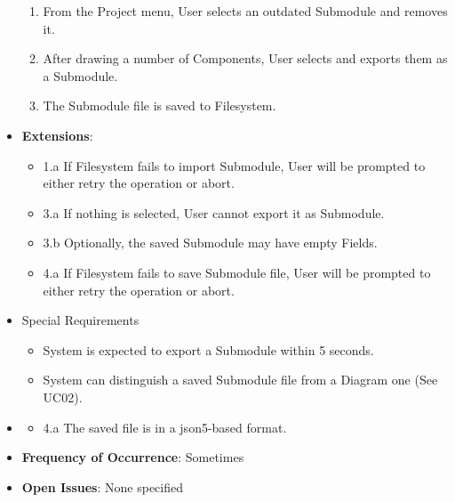 \documentclass[12pt]{article}
\begin{document}
\begin{itemize}
\begin{enumerate}
            \item From the Project menu, User selects an outdated Submodule and removes it.
            \item After drawing a number of Components, User selects and exports them as a Submodule.
            \item The Submodule file is saved to Filesystem.
        \end{enumerate}
        \item \textbf{Extensions}:
        \begin{itemize}
            \item 1.a If Filesystem fails to import Submodule, User will be prompted to either retry the operation or abort.
            \item 3.a If nothing is selected, User cannot export it as Submodule.
            \item 3.b Optionally, the saved Submodule may have empty Fields.
            \item 4.a If Filesystem fails to save Submodule file, User will be prompted to either retry the operation or abort.
        \end{itemize}
        \item Special Requirements
        \begin{itemize}
            \item System is expected to export a Submodule within 5 seconds.
            \item System can distinguish a saved Submodule file from a Diagram one (See UC02).
        \end{itemize}
        \item {}
        \begin{itemize}
            \item 4.a The saved file is in a json5-based format.
        \end{itemize}
        \item \textbf{Frequency of Occurrence}: Sometimes
        \item \textbf{Open Issues}: None specified
    \end{itemize}
\end{document}
